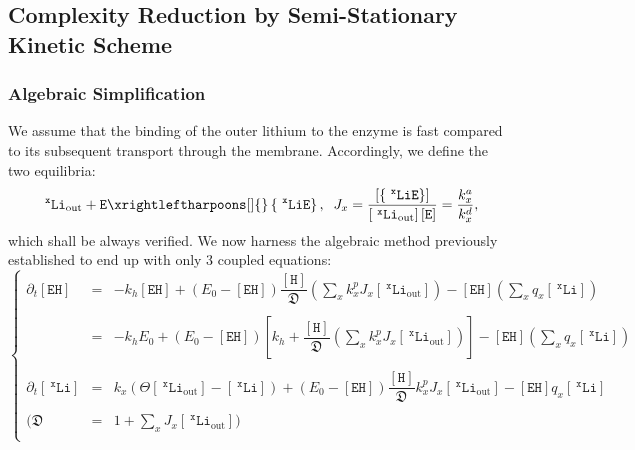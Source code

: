 \documentclass[aps,onecolumn,12pt]{revtex4}
\newcommand{\mychem}[1]{\mathtt{#1}}
\newcommand{\myconc}[1]{\left\lbrack{#1}\right\rbrack}
\newcommand{\spLi}[1]{{~^{\mychem{#1}}\mychem{Li}}}
\newcommand{\Li}[1]{\myconc{\spLi{#1}}}
\newcommand{\spEout}{\mychem{E}}
\newcommand{\Eout}{\myconc{\spEout}}
\newcommand{\spLiE}[1]{\left\lbrace\spLi{#1}\spEout\right\rbrace}
\newcommand{\LiE}[1]{\myconc{\spLiE{#1}}}
\newcommand{\spLiOut}[1]{{\spLi{#1}}_{\mathrm{out}}}
\newcommand{\LiOut}[1]{\myconc{\spLiOut{#1}}}
\newcommand{\spEHin}{\mychem{EH}}
\newcommand{\EHin}{\myconc{\spEHin}}
\newcommand{\spproton}{\mychem{H}}
\newcommand{\proton}{\myconc{\spproton}}
\newcommand{\todo}[1]{\framebox{\textbf{\color{WildStrawberry}{#1}}}}
\begin{document}
\subsection{Complexity Reduction by Semi-Stationary Kinetic Scheme}

\subsubsection{Algebraic Simplification}
We assume that the binding of the outer lithium to the enzyme is fast compared to its subsequent transport through the membrane. 
Accordingly, we define the two equilibria:
\begin{equation}
\label{eq:J}
\spLiOut{x} +  \spEout    \xrightleftharpoons[]{}  \spLiE{x}, \;\; J_x = \dfrac{\LiE{x}}{\LiOut{x} \Eout} = \dfrac{k_x^a}{k_x^d},
\end{equation}
which shall be always verified.
We now harness the algebraic method previously established\todo{ref} to end up with only 3 coupled equations:
\begin{equation}
\label{eq:sys}
\left\lbrace
	\begin{array}{rcl}
		\partial_t\EHin & = & -k_h \EHin + \left(E_0- \EHin\right) \dfrac{\proton}{\mathfrak{D}} \left(\sum_x k_x^p J_x\LiOut{x} \right)  
		- \EHin \left({\sum_x q_x \Li{x}} \right)
		\\
		\\
		& = & 
		-k_h E_0+ \left(E_0- \EHin\right)\left\lbrack k_h+ \dfrac{\proton}{\mathfrak{D}} \left(\sum_x k_x^p J_x\LiOut{x}\right)\right] 
		- \EHin \left( {\sum_x q_x \Li{x}} \right)
		\\
		\\
		\partial_t\Li{x} & = & k_x \left(\Theta\LiOut{x} -\Li{x} \right)  + \left(E_0-\EHin\right) \dfrac{\proton}{\mathfrak{D}}   k_x^p  J_x \LiOut{x}  
		- \EHin q_x \Li{x}
		\\
		\\
		(\mathfrak{D} & = & 1+\sum_x J_x \LiOut{x} )\\
	\end{array}
\right.
\end{equation}
\end{document}
